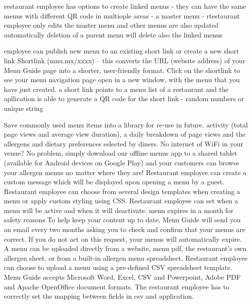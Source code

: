   restaurant employee has options to create linked menus - they can have the same menus with different QR code in multiople areas - a master menu - rtestaurant employee only edits the master menu and other menus are also updated automatically
  deletion of a parent menu will delete also the linked menus
  
  employee can publish new menu to an existing short link or create a new short link 
  Shortlink (mnu.mx/xxxx) – this converts the URL (website address) of your Menu Guide page into a shorter, user-friendly format. Click on the shortlink to see your menu navigation page open in a new window, with the menu that you have just created.
  a short link points to a menu list of a restaurant and the apllication is able to generate a QR code for the short link - random numbers or unique string

  Save commonly used menu items into a library for re-use in future. 
  activity (total page views and average view duration), a daily breakdown of page views and the allergens and dietary preferences selected by diners.
  No internet of WiFi in your venue? No problem, simply download our offline menus app to a shared tablet (available for Android devices on Google Play) and your customers can browse your allergen menus no matter where they are!
  Restaurant employee can create a custom message which will be displayed upon opening a menu by a guest.
  Restaurant employee can choose from several design templates when creating a menu or apply custom styling using CSS.
  Restaurant employee can set when a menu will be active and when it will deactivate.
  menu expires in a month for safety reasons
  To help keep your content up to date, Menu Guide will send you an email every two months asking you
  to check and confirm that your menus are correct. If you do not act on this request, your menus will
  automatically expire.
  A menu can be uploaded directly from a website, menu pdf, the restaurant's own allergen sheet, or from a built-in allergen menu spreadsheet. 
  Restaurant employee can choose to upload a menu using a pre-defined CSV spreadsheet template. Menu Guide accepts Microsoft Word, Excel, CSV and Powerpoint, Adobe PDF and Apache OpenOffice document formats. 
  The restaurant employee has to correctly set the mapping between fields in csv and application.


